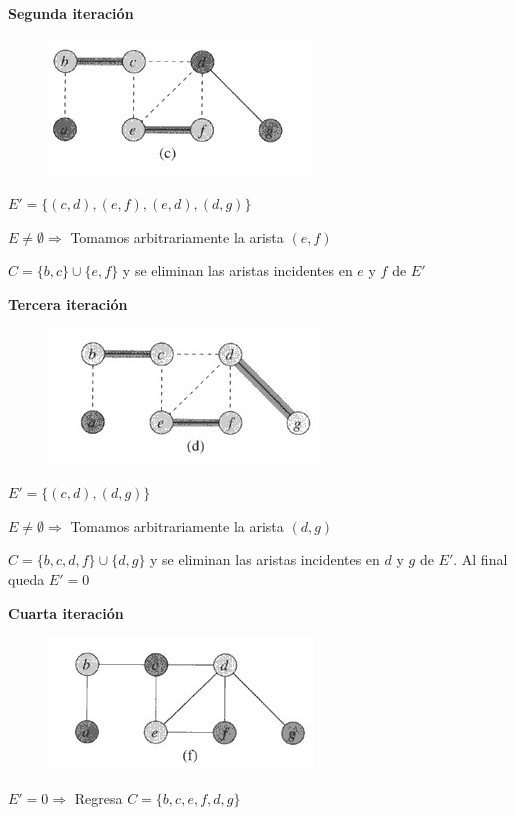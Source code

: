 \documentclass[letterpaper,12pt]{article}
\begin{document}
\textbf{Segunda iteración}

\begin{figure}[tph!]
    \centerline{\includegraphics[totalheight=3cm]{img/vc2.jpg}}
\end{figure}

$E'= \{ (c,d), (e,f), (e,d), (d,g) \}$

$E \neq \emptyset \Rightarrow$ Tomamos arbitrariamente la arista $(e,f)$

$C = \{ b,c \} \cup \{ e,f \}$ y se eliminan las aristas incidentes en $e$ y 
$f$ de $E'$

\textbf{Tercera iteración}

\begin{figure}[tph!]
    \centerline{\includegraphics[totalheight=3cm]{img/vc3.jpg}}
\end{figure}

$E'= \{ (c,d), (d,g) \}$

$E \neq \emptyset \Rightarrow$ Tomamos arbitrariamente la arista $(d,g)$

$C = \{ b,c,d,f \} \cup \{ d,g \}$ y se eliminan las aristas incidentes en $d$ y 
$g$ de $E'$. Al final queda $E' = 0$

\textbf{Cuarta iteración}

\begin{figure}[tph!]
    \centerline{\includegraphics[totalheight=3cm]{img/vc4.jpg}}
\end{figure}


$E' = 0 \Rightarrow$ Regresa $C=\{ b,c,e,f,d,g \}$ 
\end{document}
